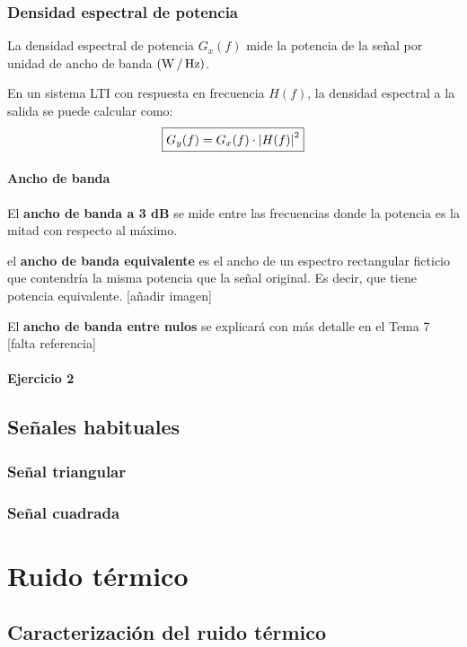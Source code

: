 \documentclass[a4paper]{book}
\begin{document}
\subsection{Densidad espectral de potencia}

La densidad espectral de potencia $G_x(f)$ mide la potencia de la señal por unidad de ancho de banda $\left( \operatorname{W} / \operatorname{Hz} \right)$.

En un sistema LTI con respuesta en frecuencia $H(f)$, la densidad espectral a la salida se puede calcular como:
\[ \boxed{G_y(f) = G_x(f) \cdot \abs{H(f)}^2} \]

\subsubsection{Ancho de banda}

El \textbf{ancho de banda a 3 dB} se mide entre las frecuencias donde la potencia es la mitad con respecto al máximo.

el \textbf{ancho de banda equivalente} es el ancho de un espectro rectangular ficticio que contendría la misma potencia que la señal original. Es decir, que tiene potencia equivalente. [añadir imagen]

El \textbf{ancho de banda entre nulos} se explicará con más detalle en el Tema 7 [falta referencia]

\subsubsection{Ejercicio 2}

\section{Señales habituales}

\subsection{Señal triangular}

\subsection{Señal cuadrada}

\chapter{Ruido térmico}
\section{Caracterización del ruido térmico}
\end{document}

